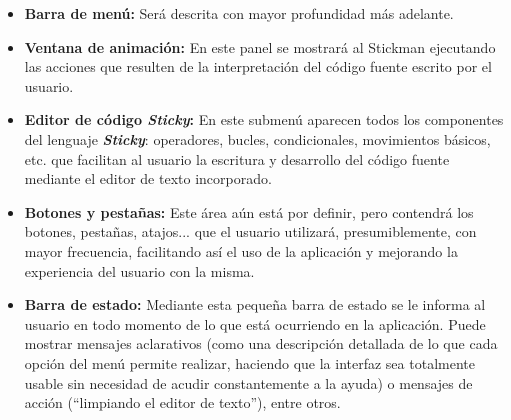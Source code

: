\documentclass[a4paper,12pt]{article}
\begin{document}
  \begin{itemize}
    \item \textbf{Barra de menú:} Será descrita con mayor profundidad más adelante.
    \item \textbf{Ventana de animación:} En este panel se mostrará al Stickman ejecutando las acciones que resulten de la interpretación del código
          fuente escrito por el usuario.
    \item \textbf{Editor de código \textbf{\textit{Sticky}}:} En este submenú aparecen todos los componentes del lenguaje \textbf{\textit{Sticky}}:
          operadores, bucles, condicionales, movimientos básicos, etc. que facilitan al usuario la escritura y desarrollo del código fuente mediante
          el editor de texto incorporado.
    \item \textbf{Botones y pestañas:} Este área aún está por definir, pero contendrá los botones, pestañas, atajos... que el usuario utilizará,
          presumiblemente, con mayor frecuencia, facilitando así el uso de la aplicación y mejorando la experiencia del usuario con la misma.
    \item \textbf{Barra de estado:} Mediante esta pequeña barra de estado se le informa al usuario en todo momento de lo que está ocurriendo en la
          aplicación. Puede mostrar mensajes aclarativos (como una descripción detallada de lo que cada opción del menú permite realizar, haciendo
          que la interfaz sea totalmente usable sin necesidad de acudir constantemente a la ayuda) o mensajes de acción (``limpiando el editor de
          texto''), entre otros.\\
  \end{itemize}
\end{document}
